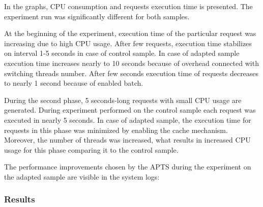 \documentclass[12pt,a4paper]{article}
\begin{document}
In the graphs, CPU consumption and requests execution time is presented. The experiment run was significantly different for both samples.

At the beginning of the experiment, execution time of the particular request was increasing due to high CPU usage. After few requests, execution time stabilizes on interval 1-5 seconds in case of control sample. In case of adapted sample execution time increases nearly to 10 seconds because of overhead connected with switching threads number. After few seconds execution time of requests decreases to nearly 1 second because of enabled batch. 

During the second phase, 5 seconds-long requests with small CPU usage are generated. During experiment performed on the control sample each request was executed in nearly 5 seconds. In case of adapted sample, the execution time for requests in this phase was minimized by enabling the cache mechanism. Moreover, the number of threads was increased, what results in increased CPU usage for this phase comparing it to the control sample.   

The performance improvements chosen by the APTS during the experiment on the adapted sample are visible in the system logs: 

\vspace{1mm}\noindent{}\vspace{1mm}

\subsubsection{Results} 
\end{document}

